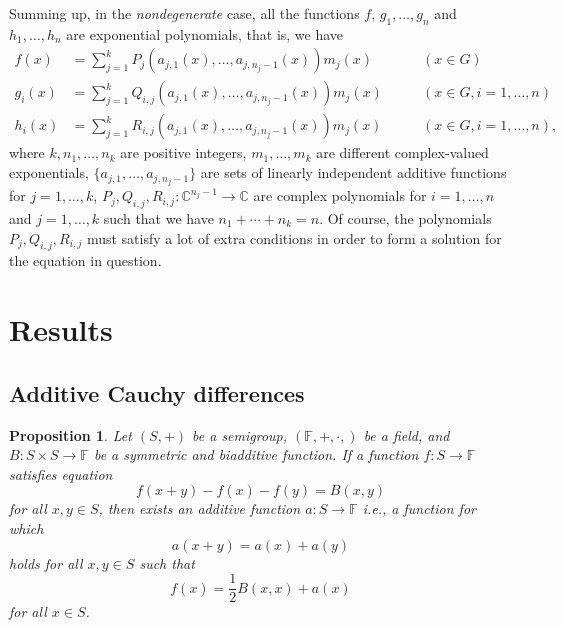 \documentclass[a4paper,12pt]{article}
\theoremstyle{plain}
\newtheorem{prop}{Proposition}
\theoremstyle{definition}
\theoremstyle{remark}
\begin{document}
Summing up, in the \emph{nondegenerate} case, all the functions $f$, $g_{1}, \ldots, g_{n}$ and $h_{1}, \ldots, h_{n}$ are exponential polynomials, that is, we have 
\begin{align*}
 f(x)&= \sum_{j=1}^{k}P_{j}(a_{j, 1}(x), \ldots, a_{j, n_{j}-1}(x)) m_{j}(x)& \qquad 
 \left(x\in G\right)\\
 g_{i}(x)&= \sum_{j=1}^{k}Q_{i, j}(a_{j, 1}(x), \ldots, a_{j, n_{j}-1}(x)) m_{j}(x)&\qquad 
 \left(x\in G, i=1, \ldots, n\right)\\
 h_{i}(x)&= \sum_{j=1}^{k}R_{i, j}(a_{j, 1}(x), \ldots, a_{j, n_{j}-1}(x)) m_{j}(x)& 
 \qquad 
 \left(x\in G, i=1, \ldots, n\right), 
\end{align*}
where $k, n_{1}, \ldots, n_{k}$ are positive integers, $m_{1}, \ldots, m_{k}$ are different complex-valued exponentials, $\{a_{j, 1}, \ldots, a_{j, n_{j}-1} \}$ are sets of linearly independent additive functions for $j=1, \ldots, k$, $P_{j}, Q_{i, j}, R_{i, j}\colon \mathbb{C}^{n_{j}-1}\to \mathbb{C}$ are complex polynomials for $i=1, \ldots, n$ and $j=1, \ldots, k$ such that we have $n_{1}+\cdots+n_{k}=n$. Of course, the polynomials  $P_{j}, Q_{i, j}, R_{i, j}$ must satisfy a lot of extra conditions in order to form a solution for the equation in question. 
 





\section{Results}

\subsection{Additive Cauchy differences}


\begin{prop}\label{prop_biadditive}
 Let $(S, +)$ be a semigroup, $(\mathbb{F},+, \cdot, )$ be a field, and $B\colon S\times S\to \mathbb{F}$ be a symmetric and biadditive function. If a function $f\colon S\to \mathbb{F}$ satisfies equation 
 \begin{equation}\label{biadditive}
  f(x+y)-f(x)-f(y)= B(x, y)
 \end{equation}
for all $x, y\in S$, then exists an additive function $a\colon S\to \mathbb{F}$ i.e., a function for which 
\[
 a(x+y)= a(x)+a(y)
\]
holds for all $x, y\in S$ such that 
\[
 f(x)= \frac{1}{2}B(x, x)+a(x)
\]
for all $x\in S$. 
\end{prop}
\end{document}
